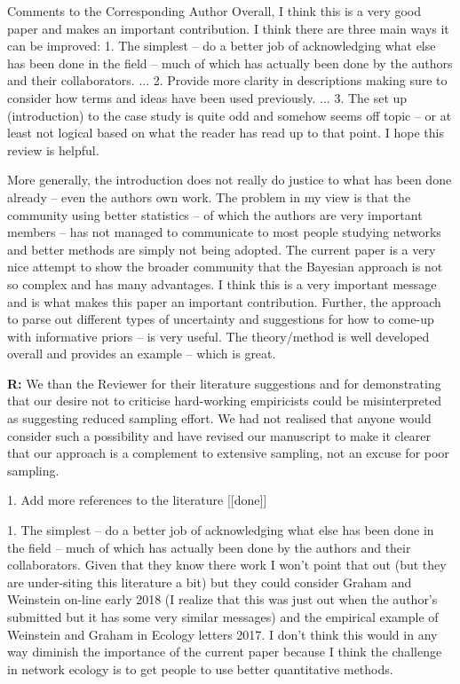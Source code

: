 \documentclass[12pt]{letter}
\newenvironment{refquote}{\bigskip \begin{it}}{\end{it}\smallskip}
\begin{document}
	\begin{refquote}
		Comments to the Corresponding Author
		Overall, I think this is a very good paper and makes an important contribution.  I think there are three main ways it can be improved: 1.      The simplest – do a better job of acknowledging what else has been done in the field – much of which has actually been done by the authors and their collaborators. ... 2.      Provide more clarity in descriptions making sure to consider how terms and ideas have been used previously. ... 3.      The set up (introduction) to the case study is quite odd and somehow seems off topic – or at least not logical based on what the reader has read up to that point.
		I hope this review is helpful.  


		More generally, the introduction does not really do justice to what has been done already – even the authors own work.  The problem in my view is that the community using better statistics – of which the authors are very important members – has not managed to communicate to most people studying networks and better methods are simply not being adopted.  The current paper is a very nice attempt to show the broader community that the Bayesian approach is not so complex and has many advantages.  I think this is a very important message and is what makes this paper an important contribution.  Further, the approach to parse out different types of uncertainty and suggestions for how to come-up with informative priors – is very useful.  The theory/method is well developed overall and provides an example – which is great.

		\end{refquote}

		\textbf{R:} We than the Reviewer for their literature suggestions and for demonstrating that our desire not to criticise hard-working empiricists could be misinterpreted as suggesting reduced sampling effort. We had not realised that anyone would consider such a possibility and have revised our manuscript to make it clearer that our approach is a complement to extensive sampling, not an excuse for poor sampling. 


	1. Add more references to the literature [[done]]

		\begin{refquote}
		1.      The simplest – do a better job of acknowledging what else has been done in the field – much of which has actually been done by the authors and their collaborators.  Given that they know there work I won’t point that out (but they are under-siting this literature a bit) but they could consider Graham and Weinstein on-line early 2018 (I realize that this was just out when the author’s submitted but it has some very similar messages) and the empirical example of Weinstein and Graham in Ecology letters 2017.  I don’t think this would in any way diminish the importance of the current paper because I think the challenge in network ecology is to get people to use better quantitative methods.
		\end{refquote}
\end{document}

